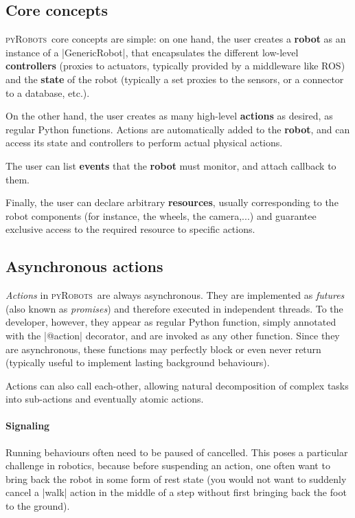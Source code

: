\documentclass[a4paper, 10pt, conference]{ieeeconf}      %
\newcommand{\pyRobots}{\textsc{pyRobots}\ }
\begin{document}
\subsection{Core concepts}

\pyRobots core concepts are simple: on one hand, the user creates a
\textbf{robot} as an instance of a \python|GenericRobot|, that encapsulates the
different low-level \textbf{controllers} (proxies to actuators, typically
provided by a middleware like ROS) and the \textbf{state} of the robot
(typically a set proxies to the sensors, or a connector to a database, etc.).

On the other hand, the user creates as many high-level \textbf{actions} as
desired, as regular Python functions. Actions are automatically added to the
\textbf{robot}, and can access its state and controllers to perform actual
physical actions.

The user can list \textbf{events} that the \textbf{robot} must monitor, and
attach callback to them.

Finally, the user can declare arbitrary \textbf{resources}, usually
corresponding to the robot components (for instance, the wheels, the camera,...)
and guarantee exclusive access to the required resource to specific actions.

\subsection{Asynchronous actions}

\emph{Actions} in \pyRobots are always asynchronous. They are implemented as
\emph{futures} (also known as \emph{promises}) and therefore executed in
independent threads. To the developer, however, they appear as regular Python
function, simply annotated with the \python|@action| decorator, and are invoked
as any other function.  Since they are asynchronous, these functions may
perfectly block or even never return (typically useful to implement lasting
background behaviours).

Actions can also call each-other, allowing natural decomposition of complex
tasks into sub-actions and eventually atomic actions.

\paragraph{Signaling} Running behaviours often need to be paused of cancelled.
This poses a particular challenge in robotics, because before suspending an
action, one often want to bring back the robot in some form of rest state (you
would not want to suddenly cancel a \python|walk| action in the middle of a step
without first bringing back the foot to the ground).
\end{document}
